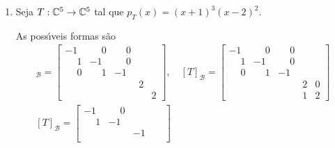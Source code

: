 \begin{exemplo}
\begin{enumerate}[label={\arabic*})]
\begin{solucao}
			Se $r = 1$, ent\~ao
			\[
				[T_2]_{\mathcal{B}_2} = \left[\begin{tabular}{ccc}
 					3 & 0 & 0\\
 					0 & 3 & 0\\
 					0 & 0 & 3
				\end{tabular}
				\right].
			\]
			Se $r = 2$, ent\~ao
			\[
				[T_1]_{\mathcal{B}_1} = \left[\begin{tabular}{cc|c}
 					3 & 0 & \\
 					1 & 3 & \\ \cline{1-3}
 					&  & 3
 				\end{tabular}
				\right].
			\]
			Se $r = 3$, ent\~ao
			\[
				[T_1]_{\mathcal{B}_1} = \left[\begin{tabular}{ccc}
 						3 & 0 & 0 \\
 						1 & 3 & 0 \\
 						0 & 1 & 3
					\end{tabular}
				\right].
			\]
			Logo existem 15 poss{\'\i}veis formas de Jordan para $T$.
		\end{solucao}
		\item Seja $T : \mathbb{C}^5 \to \mathbb{C}^5$ tal que $p_T(x) = (x + 1)^3(x - 2)^2$.
		\begin{solucao}
			As poss{\'\i}veis formas s\~ao
			\begin{align*}
				[T]_\mathcal{B} = \begin{bmatrix}
					-1 & \phantom{-}0 & \phantom{-}0 & &\\
					\phantom{-}1 & -1 & \phantom{-}0 & & \\
					\phantom{-}0 & \phantom{-}1 & -1 & &\\
					& & & 2 & \\
					& & & & 2
				\end{bmatrix}, \quad [T]_\mathcal{B} = \begin{bmatrix}
					-1 & \phantom{-}0 & \phantom{-}0 & &\\
					\phantom{-}1 & -1 & \phantom{-}0 & & \\
					\phantom{-}0 & \phantom{-}1 & -1 & &\\
					& & & 2 & 0\\
					& & & 1 & 2
				\end{bmatrix}\\
				[T]_\mathcal{B} = \begin{bmatrix}
					-1 & \phantom{-}0 & & &\\
					\phantom{-}1 & -1 & & & \\
					 &  & -1 & &\\

\end{bmatrix}
\end{align*}
\end{solucao}
\end{enumerate}
\end{exemplo}
